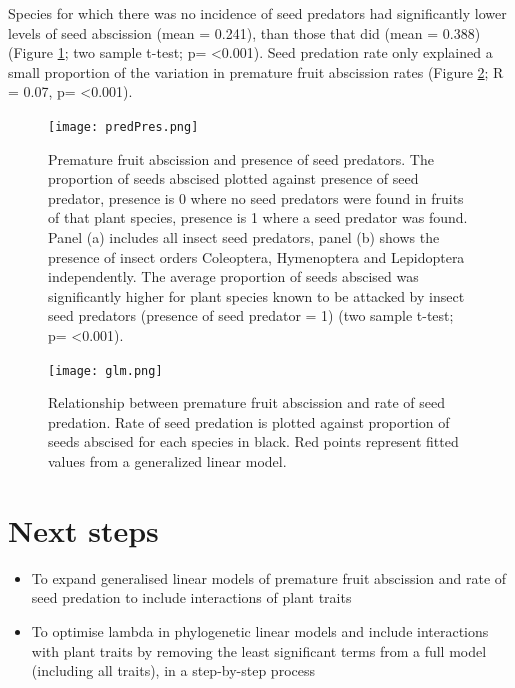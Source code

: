 Species for which there was no incidence of seed predators had significantly lower levels of seed abscission (mean = 0.241), than those that did (mean = 0.388) (Figure \ref{fig:seedbox}; two sample t-test; p= \textless0.001). Seed predation rate only explained a small proportion of the variation in premature fruit abscission rates (Figure \ref{fig:seedscatter}; R = 0.07, p= \textless0.001). \\

\begin{figure}[!h]
\centering
\texttt{[image: predPres.png]}
\caption{Premature fruit abscission and presence of seed predators. The proportion of seeds abscised plotted against presence of seed predator, presence is 0 where no seed predators were found in fruits of that plant species, presence is 1 where a seed predator was found. Panel (a) includes all insect seed predators, panel (b) shows the presence of insect orders Coleoptera, Hymenoptera and Lepidoptera independently. The average proportion of seeds abscised was significantly higher for plant species known to be attacked by insect seed predators (presence of seed predator = 1) (two sample t-test; p= \textless0.001).}
\label{fig:seedbox}
\end{figure}

\begin{figure}[!h]
\centering
\texttt{[image: glm.png]}
\caption{Relationship between premature fruit abscission and rate of seed predation. Rate of seed predation is plotted against proportion of seeds abscised for each species in black. Red points represent fitted values from a generalized linear model.}
\label{fig:seedscatter}
\end{figure}

\section{Next steps}

\begin{itemize}
\item To expand generalised linear models of premature fruit abscission and rate of seed predation to include interactions of plant traits
\item To optimise lambda in phylogenetic linear models and include interactions with plant traits by removing the least significant terms from a full model (including all traits), in a step-by-step process
\end{itemize} \\
